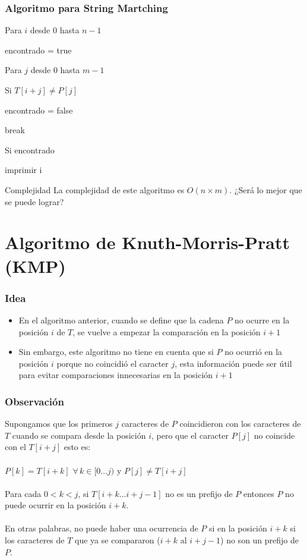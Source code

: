 \documentclass{beamer}
\begin{document}
	\begin{frame}
		\frametitle{Algoritmo para String Martching}
		\begin{enumerate}
			\item Para $i$ desde 0 hasta $n-1$
			\item encontrado = true
			{\setlength\itemindent{15pt} \item Para $j$ desde 0 hasta $m-1$}
			{\setlength\itemindent{30pt} \item Si $T[i + j] \neq P[j]$} 
			{\setlength\itemindent{45pt} \item encontrado = false}
			{\setlength\itemindent{45pt} \item break}
			\item Si encontrado
			{\setlength\itemindent{15pt} \item imprimir i}
		\end{enumerate}
		\pause
		\begin{alertblock}{Complejidad}
			La complejidad de este algoritmo es $O(n \times m)$. ¿Será lo mejor que se puede lograr?
		\end{alertblock}
	\end{frame}
	
\section[KMP]{Algoritmo de Knuth-Morris-Pratt (KMP)}
	\begin{frame}
		\frametitle{Idea}
		\begin{itemize}
			\item En el algoritmo anterior, cuando se define que la cadena $P$ no ocurre en la posición $i$ de $T$, se vuelve a empezar la comparación en la posición $i+1$
			\item Sin embargo, este algoritmo no tiene en cuenta que si $P$ no ocurrió en la posición $i$ porque no coincidió el caracter $j$, esta información puede ser útil para evitar comparaciones innecesarias en la posición $i+1$
		\end{itemize}
	\end{frame}
	
	\begin{frame}
		\frametitle{Observación}
		Supongamos que los primeros $j$ caracteres de $P$ coincidieron con los caracteres de $T$ cuando se compara desde la posición $i$, pero que el caracter $P[j]$ no coincide con el $ T[i + j]$ esto es:\\ \quad \\
		$P[k] = T[i+k] \,\, \forall \, k \in [0 \ldots j)$ \quad y \quad $P[j] \neq T[i+j]$\\ \quad \\
		Para cada $0 < k < j$, si $T[i+k \ldots i + j - 1]$ no es un prefijo de $P$ entonces $P$ no puede ocurrir en la posición $i+k$. \\ \quad \\
		En otras palabras, no puede haber una ocurrencia de $P$ si en la posición $i+k$ si los caracteres de $T$ que ya se compararon ($i+k$ al $i+j-1$) no son un prefijo de $P$.
	\end{frame}
	
\end{document}
